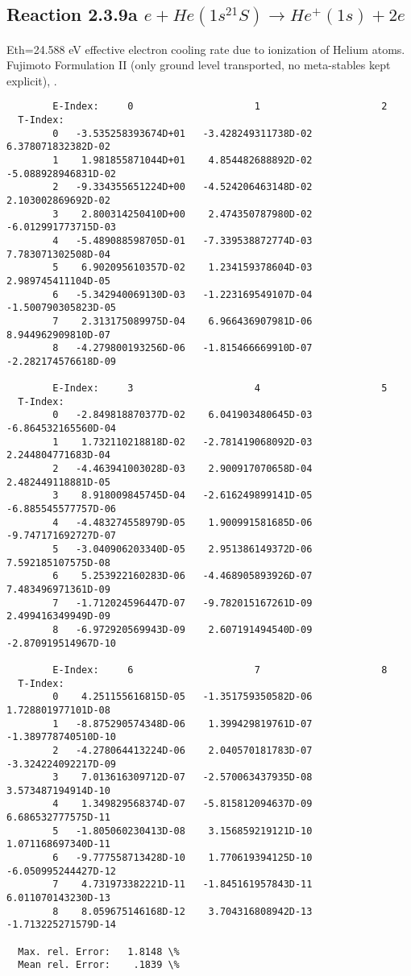 \documentclass[12pt,dvipdfmx]{article}
\begin{document}
\subsection{
Reaction 2.3.9a $e + He(1s^21S) \rightarrow He^+(1s) + 2e$
}
Eth=24.588 eV
   effective electron cooling rate due to ionization of Helium atoms.
Fujimoto Formulation II (only ground level transported, no meta-stables
 kept explicit), \cite{kn:Fujimoto}.

\begin{small}\begin{verbatim}
        E-Index:     0                     1                     2
  T-Index:
        0   -3.535258393674D+01   -3.428249311738D-02    6.378071832382D-02
        1    1.981855871044D+01    4.854482688892D-02   -5.088928946831D-02
        2   -9.334355651224D+00   -4.524206463148D-02    2.103002869692D-02
        3    2.800314250410D+00    2.474350787980D-02   -6.012991773715D-03
        4   -5.489088598705D-01   -7.339538872774D-03    7.783071302508D-04
        5    6.902095610357D-02    1.234159378604D-03    2.989745411104D-05
        6   -5.342940069130D-03   -1.223169549107D-04   -1.500790305823D-05
        7    2.313175089975D-04    6.966436907981D-06    8.944962909810D-07
        8   -4.279800193256D-06   -1.815466669910D-07   -2.282174576618D-09

        E-Index:     3                     4                     5
  T-Index:
        0   -2.849818870377D-02    6.041903480645D-03   -6.864532165560D-04
        1    1.732110218818D-02   -2.781419068092D-03    2.244804771683D-04
        2   -4.463941003028D-03    2.900917070658D-04    2.482449118881D-05
        3    8.918009845745D-04   -2.616249899141D-05   -6.885545577757D-06
        4   -4.483274558979D-05    1.900991581685D-06   -9.747171692727D-07
        5   -3.040906203340D-05    2.951386149372D-06    7.592185107575D-08
        6    5.253922160283D-06   -4.468905893926D-07    7.483496971361D-09
        7   -1.712024596447D-07   -9.782015167261D-09    2.499416349949D-09
        8   -6.972920569943D-09    2.607191494540D-09   -2.870919514967D-10

        E-Index:     6                     7                     8
  T-Index:
        0    4.251155616815D-05   -1.351759350582D-06    1.728801977101D-08
        1   -8.875290574348D-06    1.399429819761D-07   -1.389778740510D-10
        2   -4.278064413224D-06    2.040570181783D-07   -3.324224092217D-09
        3    7.013616309712D-07   -2.570063437935D-08    3.573487194914D-10
        4    1.349829568374D-07   -5.815812094637D-09    6.686532777575D-11
        5   -1.805060230413D-08    3.156859219121D-10    1.071168697340D-11
        6   -9.777558713428D-10    1.770619394125D-10   -6.050995244427D-12
        7    4.731973382221D-11   -1.845161957843D-11    6.011070143230D-13
        8    8.059675146168D-12    3.704316808942D-13   -1.713225271579D-14

  Max. rel. Error:   1.8148 \%
  Mean rel. Error:    .1839 \%

\end{verbatim}\end{small}
\end{document}
